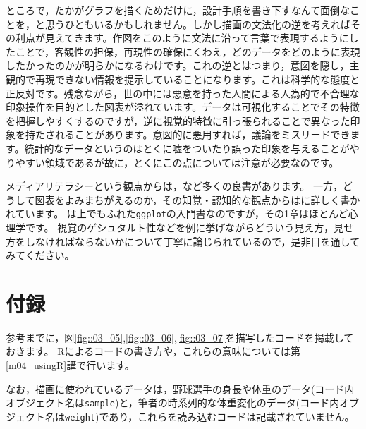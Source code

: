\documentclass{ltjsbook}
\begin{document}
ところで，たかがグラフを描くためだけに，設計手順を書き下すなんて面倒なことを，と思うひともいるかもしれません。しかし描画の文法化の逆を考えればその利点が見えてきます。作図をこのように文法に沿って言葉で表現するようにしたことで，客観性の担保，再現性の確保にくわえ，どのデータをどのように表現したかったのかが明らかになるわけです。これの逆とはつまり，意図を隠し，主観的で再現できない情報を提示していることになります。これは科学的な態度と正反対です。残念ながら，世の中には悪意を持った人間による人為的で不合理な印象操作を目的とした図表が溢れています。データは可視化することでその特徴を把握しやすくするのですが，逆に視覚的特徴に引っ張られることで異なった印象を持たされることがあります。意図的に悪用すれば，議論をミスリードできます。統計的なデータというのはとくに嘘をついたり誤った印象を与えることがやりやすい領域であるが故に，とくにこの点については注意が必要なのです。

メディアリテラシーという観点からは，\textcite{Takagi196807}など多くの良書があります。
一方，どうして図表をよみまちがえるのか，その知覚・認知的な観点からは\textcite{Kieran2018}に詳しく書かれています。
\textcite{Kieran2018}は上でもふれた\texttt{ggplot}の入門書なのですが，その1章はほとんど心理学です。
視覚のゲシュタルト性などを例に挙げながらどういう見え方，見せ方をしなければならないかについて丁寧に論じられているので，是非目を通してみてください。

\section{付録}

参考までに，図\ref{fig::03_05},\ref{fig::03_06},\ref{fig::03_07}を描写したコードを掲載しておきます。
Rによるコードの書き方や，これらの意味については第\ref{m04_usingR}講で行います。

なお，描画に使われているデータは，野球選手の身長や体重のデータ(コード内オブジェクト名は\texttt{sample})と，筆者の時系列的な体重変化のデータ(コード内オブジェクト名は\texttt{weight})であり，これらを読み込むコードは記載されていません。
\end{document}
